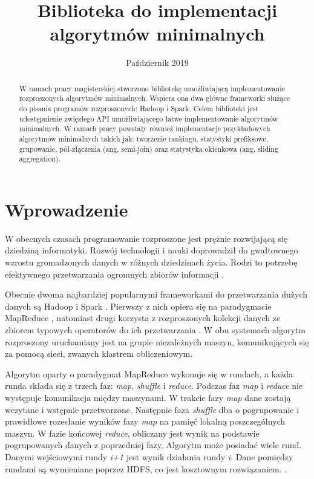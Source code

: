 \documentclass[magisterska]{pracamgr}
\title{Biblioteka do implementacji algorytmów minimalnych}
\date{Październik 2019}
\begin{document}
\maketitle

\begin{abstract}
W ramach pracy magisterskiej stworzono bibliotekę umożliwiającą implementowanie rozproszonych algorytmów minimalnych. Wspiera ona dwa główne frameworki służące do pisania programów rozproszonych: Hadoop i Spark. Celem biblioteki jest udostępnienie zwięzłego API umożliwiającego łatwe implementowanie algorytmów minimalnych. W ramach pracy powstały również implementacje przykładowych algorytmów minimalnych takich jak: tworzenie rankingu, statystyki prefiksowe, grupowanie, pół-złączenia (ang. semi-join) oraz statystyka okienkowa (ang. sliding aggregation).
\end{abstract}
\tableofcontents

\chapter{Wprowadzenie}

W obecnych czasach programowanie rozproszone jest prężnie rozwijającą się dziedziną informatyki. Rozwój technologii i nauki doprowadził do gwałtownego wzrostu gromadzonych danych w różnych dziedzinach życia. Rodzi to potrzebę efektywnego przetwarzania ogromnych zbiorów informacji \cite{watson2014tutorial, wu2013data}.

Obecnie dwoma najbardziej popularnymi frameworkami do przetwarzania dużych danych są Hadoop i Spark \cite{da2015survey}. Pierwszy z nich opiera się na paradygmacie MapReduce \cite{white2012hadoop}, natomiast drugi korzysta z rozproszonych kolekcji danych ze zbiorem typowych operatorów do ich przetwarzania \cite{zaharia2010spark}. W obu systemach algorytm rozproszony uruchamiany jest na grupie niezależnych maszyn, komunikujących się za pomocą sieci, zwanych klastrem obliczeniowym.

Algorytm oparty o paradygmat MapReduce wykonuje się w rundach, a każda runda składa się z trzech faz: \textit{map}, \textit{shuffle} i \textit{reduce}. Podczas faz \textit{map} i \textit{reduce} nie występuje komunikacja między maszynami. W trakcie fazy \textit{map} dane zostają wczytane i wstępnie przetworzone. Następnie faza \textit{shuffle} dba o pogrupowanie i prawidłowe rozesłanie wyników fazy \textit{map} na pamięć lokalną poszczególnych maszyn. W fazie końcowej \textit{reduce}, obliczany jest wynik na podstawie pogrupowanych danych z poprzedniej fazy. Algorytm może posiadać wiele rund. Danymi wejściowymi rundy \textit{i+1} jest wynik działania rundy \textit{i}. Dane pomiędzy rundami są wymieniane poprzez HDFS, co jest kosztownym rozwiązaniem. \cite{shvachko2010hadoop, taylor2010overview, white2012hadoop}.
\end{document}
